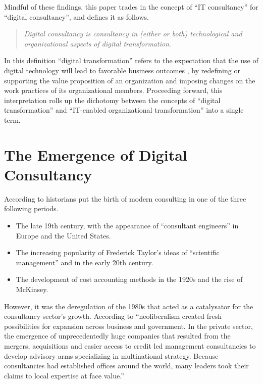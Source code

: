 \documentclass[12pt]{article}
\begin{document}
Mindful of these findings, this paper trades in the concept of ``IT
consultancy'' for ``digital consultancy'', and defines it as follows.

\begin{quote}
\emph{Digital consultancy is consultancy in (either or both)
technological and organizational aspects of digital transformation}.
\end{quote}

In this definition ``digital transformation'' refers to the expectation
that the use of digital technology will lead to favorable business
outcomes \citep[ 104-118]{wessel2020}, by redefining or supporting the
value proposition of an organization and imposing changes on the work
practices of its organizational members. Proceeding forward, this
interpretation rolls up the dichotomy between the concepts of ``digital
transformation'' and ``IT-enabled organizational transformation'' into a
single term.

\section{The Emergence of Digital
Consultancy}\label{the-emergence-of-digital-consultancy}

According to \citet[46]{mazzucato2023} historians put the birth of
modern consulting in one of the three following periods.

\begin{itemize}
\item
  The late 19th century, with the appearance of ``consultant engineers''
  in Europe and the United States.
\item
  The increasing popularity of Frederick Taylor's ideas of ``scientific
  management'' and in the early 20th century.
\item
  The development of cost accounting methods in the 1920s and the rise
  of McKinsey.
\end{itemize}

However, it was the deregulation of the 1980s that acted as a
catalysator for the consultancy sector's growth. According to
\citet[61]{mazzucato2023} ``neoliberalism created fresh possibilities
for expansion across business and government. In the private sector, the
emergence of unprecedentedly huge companies that resulted from the
mergers, acquisitions and easier access to credit led management
consultancies to develop advisory arms specializing in multinational
strategy. Because consultancies had established offices around the
world, many leaders took their claims to local expertise at face
value.''
\end{document}
